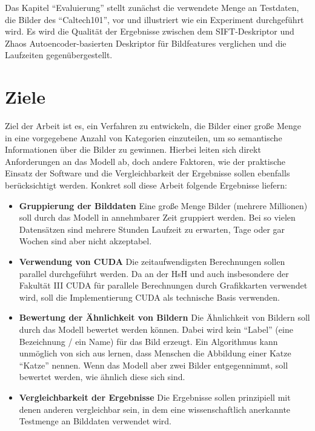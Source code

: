 Das Kapitel \enquote{Evaluierung} stellt zunächst die verwendete Menge an Testdaten, die Bilder des \enquote{Caltech101}, vor und illustriert wie ein Experiment durchgeführt wird. Es wird die Qualität der Ergebnisse zwischen dem SIFT-Deskriptor und Zhaos Autoencoder-basierten Deskriptor für Bildfeatures verglichen und die Laufzeiten gegenübergestellt.


\section{Ziele}

Ziel der Arbeit ist es, ein Verfahren zu entwickeln, die Bilder einer große Menge in eine vorgegebene Anzahl von Kategorien einzuteilen, um so semantische Informationen über die Bilder zu gewinnen. Hierbei leiten sich direkt Anforderungen an das Modell ab, doch andere Faktoren, wie der praktische Einsatz der Software und die Vergleichbarkeit der Ergebnisse sollen ebenfalls berücksichtigt werden. Konkret soll diese Arbeit folgende Ergebnisse liefern:

\begin{itemize}
	\item \textbf{Gruppierung der Bilddaten} Eine große Menge Bilder (mehrere Millionen) soll durch das Modell in annehmbarer Zeit gruppiert werden. Bei so vielen Datensätzen sind mehrere Stunden Laufzeit zu erwarten, Tage oder gar Wochen sind aber nicht akzeptabel. 
	\item \textbf{Verwendung von CUDA} Die zeitaufwendigsten Berechnungen sollen parallel durchgeführt werden. Da an der HsH und auch insbesondere der Fakultät III CUDA für parallele Berechnungen durch Grafikkarten verwendet wird, soll die Implementierung CUDA als technische Basis verwenden.
	\item \textbf{Bewertung der Ähnlichkeit von Bildern} Die Ähnlichkeit von Bildern soll durch das Modell bewertet werden können. Dabei wird kein \enquote{Label} (eine Bezeichnung / ein Name) für das Bild erzeugt. Ein Algorithmus kann unmöglich von sich aus lernen, dass Menschen die Abbildung einer Katze \enquote{Katze} nennen. Wenn das Modell aber zwei Bilder entgegennimmt, soll bewertet werden, wie ähnlich diese sich sind.
	\item \textbf{Vergleichbarkeit der Ergebnisse} Die Ergebnisse sollen prinzipiell mit denen anderen vergleichbar sein, in dem eine wissenschaftlich anerkannte Testmenge an Bilddaten verwendet wird.
\end{itemize}
